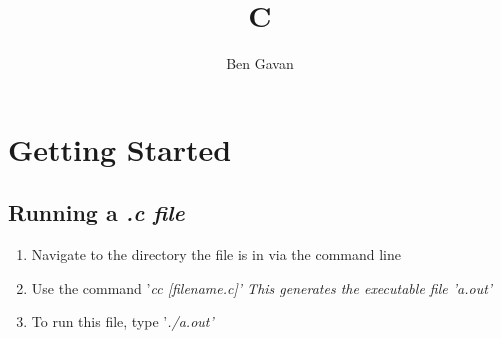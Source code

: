 \title{C}
\author{Ben Gavan}



\maketitle

\begin{abstract}

\end{abstract}

\section{Getting Started}

\subsection{Running a \it{.c} file}
\begin{enumerate}
	\item Navigate to the directory the file is in via the command line
	\item Use the command '\it{cc [filename.c]}'
	\subitem This generates the executable file '\it{a.out}'
	\item To run this file, type '\it{./a.out}'
\end{enumerate}


